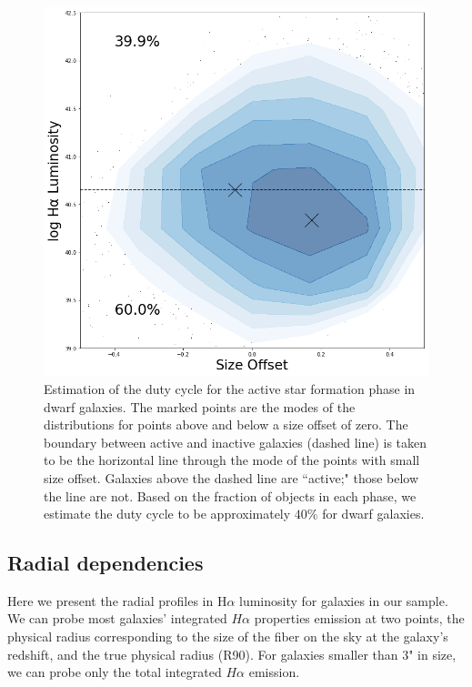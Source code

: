 \documentclass[iop]{emulateapj}
\begin{document}
\begin{figure}
	\centering
	\includegraphics[width=1.5 \columnwidth]{duty.png}
	\caption{Estimation of the duty cycle for the active star formation phase in dwarf galaxies. The marked points are the modes of the distributions for points above and below a size offset of zero. The boundary between active and inactive galaxies (dashed line) is taken to be the horizontal line through the mode of the points with small size offset. Galaxies above the dashed line are ``active;" those below the line are not. Based on the fraction of objects in each phase, we estimate the duty cycle to be approximately $40\%$ for dwarf galaxies.}
     \label{fig:HA_duty}

\end{figure}


\subsection{Radial dependencies}

Here we present the radial profiles in H$\alpha$ luminosity for galaxies in our sample. We can probe most galaxies' integrated $H\alpha$ properties emission at two points, the physical radius corresponding to the size of the fiber on the sky at the galaxy's redshift, and the true physical radius (R90). For galaxies smaller than 3" in size, we can probe only the total integrated $H\alpha$ emission. 
\end{document}
